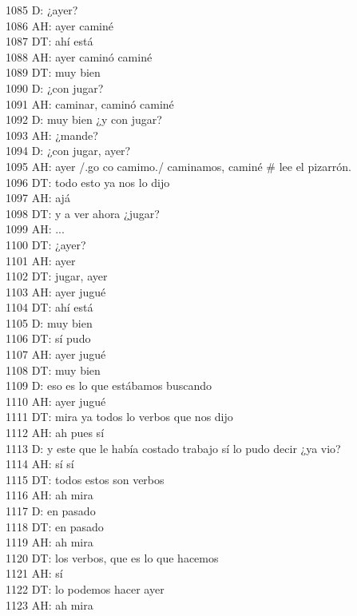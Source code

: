 1085 D: ¿ayer?\\
1086 AH: ayer caminé\\
1087 DT: ahí está\\
1088 AH: ayer caminó caminé\\
1089 DT: muy bien\\
1090 D: ¿con jugar?\\
1091 AH: caminar, caminó caminé\\
1092 D: muy bien ¿y con jugar?\\
1093 AH: ¿mande?\\
1094 D: ¿con jugar, ayer?\\
1095 AH: ayer /.go co camimo./ caminamos, caminé \# lee el pizarrón.\\
1096 DT: todo esto ya nos lo dijo\\
1097 AH: ajá\\
1098 DT: y a ver ahora ¿jugar?\\
1099 AH: ...\\
1100 DT: ¿ayer?\\
1101 AH: ayer\\
1102 DT: jugar, ayer\\
1103 AH: ayer jugué\\
1104 DT: ahí está\\
1105 D: muy bien\\
1106 DT: sí pudo\\
1107 AH: ayer jugué\\
1108 DT: muy bien\\
1109 D: eso es lo que estábamos buscando\\
1110 AH: ayer jugué\\
1111 DT: mira ya todos lo verbos que nos dijo\\
1112 AH: ah pues sí\\
1113 D: y este que le había costado trabajo sí lo pudo decir ¿ya vio?\\
1114 AH: sí sí\\
1115 DT: todos estos son verbos\\
1116 AH: ah mira\\
1117 D: en pasado\\
1118 DT: en pasado\\
1119 AH: ah mira\\
1120 DT: los verbos, que es lo que hacemos\\
1121 AH: sí\\
1122 DT: lo podemos hacer ayer\\
1123 AH: ah mira\\
